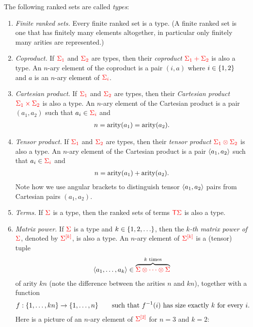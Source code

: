 \begin{definition}[Types] \label{def:types} The following ranked sets are called \emph{types}:
    \begin{enumerate}
        \item  \emph{Finite ranked sets.} Every finite  ranked set is a type. (A finite ranked set is one that  has finitely many elements altogether, in particular only finitely many arities are represented.)
        \item \emph{Coproduct.} If ${\color{red}{\Sigma_1}}$ and ${\color{red}{\Sigma_2}}$ are types, then  their \emph{coproduct} ${\color{red}{\Sigma_1 + \Sigma_2}}$
        is also a type. An $n$-ary element of the coproduct is a pair $(i,a)$ where $i \in \{1,2\}$ and $a$ is an $n$-ary element of  ${\color{red}{\Sigma_i}}$. 
        \item \emph{Cartesian product.} If ${\color{red}{\Sigma_1}}$ and ${\color{red}{\Sigma_2}}$ are types, then  their \emph{Cartesian product}
        $ {\color{red}{\Sigma_1 \times \Sigma_2}}$
        is also a type. An $n$-ary element of the Cartesian product is a pair $(a_1,a_2)$ such that $a_i \in {\color{red}{\Sigma_i}}$ and 
        \begin{align*}
            n = \mathrm{arity}(a_1) = \mathrm{arity}(a_2).
        \end{align*}
        \item \emph{Tensor product.} If ${\color{red}{\Sigma_1}}$ and ${\color{red}{\Sigma_2}}$ are types, then  their \emph{tensor product}
        $ {\color{red}{\Sigma_1 \otimes \Sigma_2}}$
        is also a type. An $n$-ary element of the Cartesian product is a pair $\langle{a_1,a_2}\rangle$ such that $a_i \in {\color{red}{\Sigma_i}}$ and 
        \begin{align*}
            n = \mathrm{arity}(a_1) + \mathrm{arity}(a_2).
        \end{align*}
        Note how we use  angular brackets to distinguish tensor $\langle{a_1,a_2}\rangle$ pairs from Cartesian pairs $(a_1,a_2)$.
        \item \emph{Terms.} If ${\color{red}{\Sigma}}$ is a type, then  the ranked sets of terms  ${\color{red}{\mathsf T}} {\color{red}{\Sigma}}$ is also a type.
       \item \emph{Matrix power.}  If  ${\color{red}{\Sigma}}$ is a type and $k \in \{1,2,\ldots\}$, then the \emph{$k$-th matrix power of ${\color{red}{\Sigma}}$}, denoted by ${\color{red}{\Sigma^{[k]}}}$, is also a type.  An $n$-ary element of ${\color{red}{\Sigma^{[k]}}}$ is a (tensor) tuple
       \begin{align*}
           \langle{a_1,\ldots,a_k}\rangle \in \overbrace{{\color{red}{\Sigma \otimes \cdots \otimes \Sigma}}}^{\text{$k$ times}} 
       \end{align*}
       of arity $kn$ (note the difference between the arities $n$ and $kn$), together with a function
       \begin{align*}
           f : \{1,\ldots,kn\} \to \{1,\ldots,n\} \qquad \text{such that $f^{-1}(i)$ has size exactly $k$ for every $i$.}
       \end{align*}
       Here is a picture of an $n$-ary element of  ${\color{red}{\Sigma^{[2]}}}$ for $n=3$ and $k=2$:
    \end{enumerate}
\end{definition}

